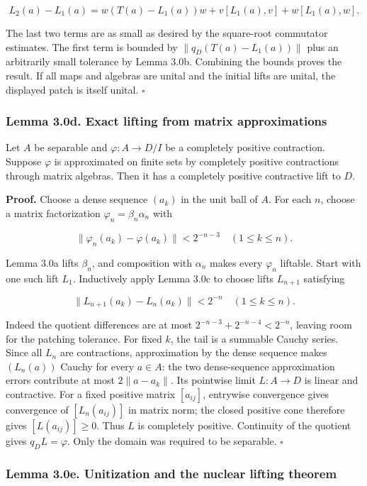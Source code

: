 \documentclass[
  11pt,
]{article}
\begin{document}
\[
L_2(a)-L_1(a)
=w(T(a)-L_1(a))w
+v[L_1(a),v]+w[L_1(a),w].
\]

The last two terms are as small as desired by the square-root commutator
estimates. The first term is bounded by \(\|q_D(T(a)-L_1(a))\|\) plus an
arbitrarily small tolerance by Lemma 3.0b. Combining the bounds proves
the result. If all maps and algebras are unital and the initial lifts
are unital, the displayed patch is itself unital. \(\square\)

\subsubsection{Lemma 3.0d. Exact lifting from matrix
approximations}\label{lemma-3.0d.-exact-lifting-from-matrix-approximations}

Let \(A\) be separable and \(\varphi:A\to D/I\) be a completely positive
contraction. Suppose \(\varphi\) is approximated on finite sets by
completely positive contractions through matrix algebras. Then it has a
completely positive contractive lift to \(D\).

\textbf{Proof.} Choose a dense sequence \((a_k)\) in the unit ball of
\(A\). For each \(n\), choose a matrix factorization
\(\varphi_n=\beta_n\alpha_n\) with

\[
\|\varphi_n(a_k)-\varphi(a_k)\|<2^{-n-3}
\quad(1\leq k\leq n).
\]

Lemma 3.0a lifts \(\beta_n\), and composition with \(\alpha_n\) makes
every \(\varphi_n\) liftable. Start with one such lift \(L_1\).
Inductively apply Lemma 3.0c to choose lifts \(L_{n+1}\) satisfying

\[
\|L_{n+1}(a_k)-L_n(a_k)\|<2^{-n}
\quad(1\leq k\leq n).
\]

Indeed the quotient differences are at most
\(2^{-n-3}+2^{-n-4}<2^{-n}\), leaving room for the patching tolerance.
For fixed \(k\), the tail is a summable Cauchy series. Since all \(L_n\)
are contractions, approximation by the dense sequence makes \((L_n(a))\)
Cauchy for every \(a\in A\): the two dense-sequence approximation errors
contribute at most \(2\|a-a_k\|\). Its pointwise limit \(L:A\to D\) is
linear and contractive. For a fixed positive matrix \([a_{ij}]\),
entrywise convergence gives convergence of \([L_n(a_{ij})]\) in matrix
norm; the closed positive cone therefore gives \([L(a_{ij})]\geq0\).
Thus \(L\) is completely positive. Continuity of the quotient gives
\(q_DL=\varphi\). Only the domain was required to be separable.
\(\square\)

\subsubsection{Lemma 3.0e. Unitization and the nuclear lifting
theorem}\label{lemma-3.0e.-unitization-and-the-nuclear-lifting-theorem}
\end{document}
